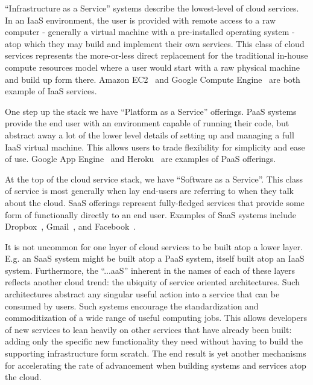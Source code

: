 \begin{packed_desc}
\item[IaaS:] ``Infrastructure as a Service'' systems describe the
  lowest-level of cloud services. In an IaaS environment, the user is
  provided with remote access to a raw computer - generally a virtual
  machine with a pre-installed operating system - atop which they may
  build and implement their own services. This class of cloud services
  represents the more-or-less direct replacement for the traditional
  in-house compute resources model where a user would start with a raw
  physical machine and build up form there. Amazon
  EC2~\cite{amazon-ec2} and Google Compute
  Engine~\cite{google-compute} are both example of IaaS services.
\item[PaaS:] One step up the stack we have ``Platform as a Service''
  offerings. PaaS systems provide the end user with an environment
  capable of running their code, but abstract away a lot of the lower
  level details of setting up and managing a full IaaS virtual
  machine. This allows users to trade flexibility for simplicity and
  ease of use. Google App Engine~\cite{google-appengine} and
  Heroku~\cite{heroku} are examples of PaaS offerings.
\item[SaaS:] At the top of the cloud service stack, we have ``Software
  as a Service''. This class of service is most generally when lay
  end-users are referring to when they talk about the cloud. SaaS
  offerings represent fully-fledged services that provide some form of
  functionally directly to an end user. Examples of SaaS systems
  include Dropbox~\cite{dropbox}, Gmail~\cite{google-gmail}, and
  Facebook~\cite{facebook}.
\end{packed_desc}

It is not uncommon for one layer of cloud services to be built atop a
lower layer. E.g. an SaaS system might be built atop a PaaS system,
itself built atop an IaaS system. Furthermore, the ``...aaS'' inherent
in the names of each of these layers reflects another cloud trend: the
ubiquity of service oriented architectures. Such architectures
abstract any singular useful action into a service that can be
consumed by users. Such systems encourage the standardization and
commoditization of a wide range of useful computing jobs. This allows
developers of new services to lean heavily on other services that have
already been built: adding only the specific new functionality they
need without having to build the supporting infrastructure form
scratch. The end result is yet another mechanisms for accelerating the
rate of advancement when building systems and services atop the cloud.

